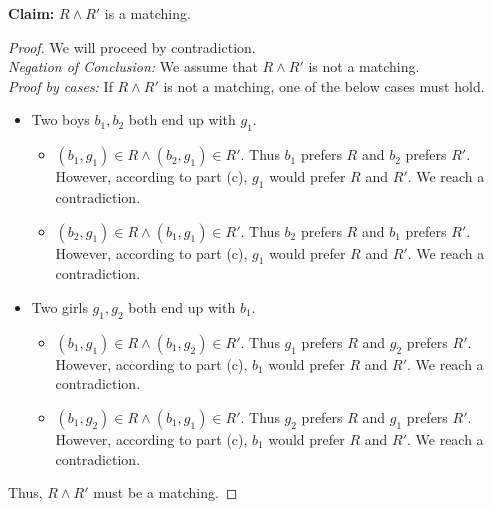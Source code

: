 \documentclass[11pt]{article}
\begin{document}
\begin{Parts}
        \begin{Answer}
            \textbf{Claim:} $R \land R'$ is a matching. 
            \begin{proof}
                We will proceed by contradiction. \\ 
                \emph{Negation of Conclusion:} We assume that $R \land R'$ is not a matching. \\
                \emph{Proof by cases:} If $R \land R'$ is not a matching, one of the below cases must hold.
                \begin{itemize}
                    \item Two boys $b_1,b_2$ both end up with $g_1$.
                        \begin{itemize}
                            \item $(b_1,g_1)\in R \land (b_2,g_1)\in R'$. Thus $b_1$ prefers $R$ and $b_2$ prefers $R'$. However, 
                            according to part (c), $g_1$ would prefer $R$ and $R'$. We reach a contradiction. 
                            \item $(b_2,g_1)\in R \land (b_1,g_1)\in R'$. Thus $b_2$ prefers $R$ and $b_1$ prefers $R'$. However, 
                            according to part (c), $g_1$ would prefer $R$ and $R'$. We reach a contradiction. 
                        \end{itemize} 
                    \item Two girls $g_1,g_2$ both end up with $b_1$.
                        \begin{itemize}
                            \item $(b_1,g_1)\in R \land (b_1,g_2)\in R'$. Thus $g_1$ prefers $R$ and $g_2$ prefers $R'$. However, 
                            according to part (c), $b_1$ would prefer $R$ and $R'$. We reach a contradiction. 
                            \item $(b_1,g_2)\in R \land (b_1,g_1)\in R'$. Thus $g_2$ prefers $R$ and $g_1$ prefers $R'$. However, 
                            according to part (c), $b_1$ would prefer $R$ and $R'$. We reach a contradiction. 
                        \end{itemize} 
                \end{itemize}
                Thus, $R \land R'$ must be a matching. 
            \end{proof}


\end{Answer}
\end{Parts}
\end{document}
